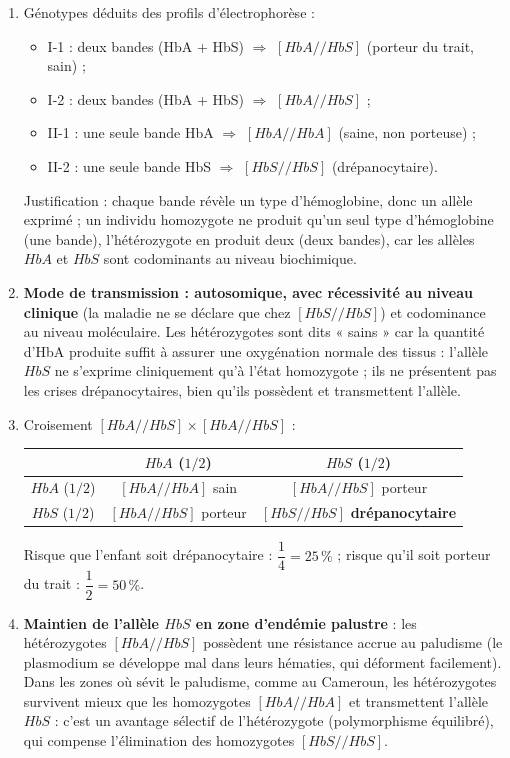\documentclass[11pt]{article}
\newcommand{\cle}[1]{{\popxbold\color{popdark}#1}}
\begin{document}
\begin{corrige}
\begin{enumerate}
\item Génotypes déduits des profils d'électrophorèse :
\begin{itemize}
\item I-1 : deux bandes (HbA + HbS) $\Rightarrow$ $[HbA//HbS]$ (porteur du trait, sain) ;
\item I-2 : deux bandes (HbA + HbS) $\Rightarrow$ $[HbA//HbS]$ ;
\item II-1 : une seule bande HbA $\Rightarrow$ $[HbA//HbA]$ (saine, non porteuse) ;
\item II-2 : une seule bande HbS $\Rightarrow$ $[HbS//HbS]$ (drépanocytaire).
\end{itemize}
Justification : chaque bande révèle un type d'hémoglobine, donc un allèle exprimé ; un individu homozygote ne produit qu'un seul type d'hémoglobine (une bande), l'hétérozygote en produit deux (deux bandes), car les allèles $HbA$ et $HbS$ sont \cle{codominants} au niveau biochimique.
\item \textbf{Mode de transmission : autosomique, avec récessivité au niveau clinique} (la maladie ne se déclare que chez $[HbS//HbS]$) et codominance au niveau moléculaire. Les hétérozygotes sont dits « sains » car la quantité d'HbA produite suffit à assurer une oxygénation normale des tissus : l'allèle $HbS$ ne s'exprime cliniquement qu'à l'état homozygote ; ils ne présentent pas les crises drépanocytaires, bien qu'ils possèdent et transmettent l'allèle.
\item Croisement $[HbA//HbS]\times[HbA//HbS]$ :
\begin{center}
\begin{tabular}{|c|c|c|}\hline
\rowcolor{popblueL} & $HbA$ ($1/2$) & $HbS$ ($1/2$) \\ \hline
$HbA$ ($1/2$) & $[HbA//HbA]$ sain & $[HbA//HbS]$ porteur \\ \hline
$HbS$ ($1/2$) & $[HbA//HbS]$ porteur & $[HbS//HbS]$ \textbf{drépanocytaire} \\ \hline
\end{tabular}
\end{center}
Risque que l'enfant soit drépanocytaire : $\dfrac{1}{4}=25\,\%$ ; risque qu'il soit porteur du trait : $\dfrac{1}{2}=50\,\%$.
\item \textbf{Maintien de l'allèle $HbS$ en zone d'endémie palustre} : les hétérozygotes $[HbA//HbS]$ possèdent une \cle{résistance accrue au paludisme} (le plasmodium se développe mal dans leurs hématies, qui déforment facilement). Dans les zones où sévit le paludisme, comme au Cameroun, les hétérozygotes survivent mieux que les homozygotes $[HbA//HbA]$ et transmettent l'allèle $HbS$ : c'est un \cle{avantage sélectif de l'hétérozygote} (polymorphisme équilibré), qui compense l'élimination des homozygotes $[HbS//HbS]$.

\end{enumerate}
\end{corrige}
\end{document}
